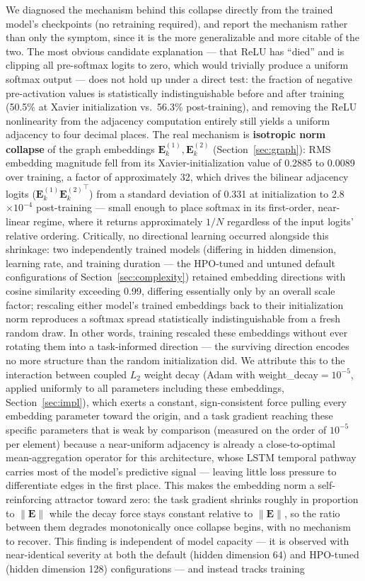 \documentclass[journal]{IEEEtran}
\begin{document}
We diagnosed the mechanism behind this collapse directly from the trained model's checkpoints (no retraining required), and report the mechanism rather than only the symptom, since it is the more generalizable and more citable of the two. The most obvious candidate explanation --- that ReLU has ``died'' and is clipping all pre-softmax logits to zero, which would trivially produce a uniform softmax output --- does not hold up under a direct test: the fraction of negative pre-activation values is statistically indistinguishable before and after training (50.5\% at Xavier initialization vs.\ 56.3\% post-training), and removing the ReLU nonlinearity from the adjacency computation entirely still yields a uniform adjacency to four decimal places. The real mechanism is \textbf{isotropic norm collapse} of the graph embeddings $\mathbf{E}^{(1)}_k,\mathbf{E}^{(2)}_k$ (Section~\ref{sec:graph}): RMS embedding magnitude fell from its Xavier-initialization value of 0.2885 to 0.0089 over training, a factor of approximately 32, which drives the bilinear adjacency logits ($\mathbf{E}^{(1)}_k{\mathbf{E}^{(2)}_k}^\top$) from a standard deviation of 0.331 at initialization to 2.8$\times 10^{-4}$ post-training --- small enough to place softmax in its first-order, near-linear regime, where it returns approximately $1/N$ regardless of the input logits' relative ordering. Critically, no directional learning occurred alongside this shrinkage: two independently trained models (differing in hidden dimension, learning rate, and training duration --- the HPO-tuned and untuned default configurations of Section~\ref{sec:complexity}) retained embedding directions with cosine similarity exceeding 0.99, differing essentially only by an overall scale factor; rescaling either model's trained embeddings back to their initialization norm reproduces a softmax spread statistically indistinguishable from a fresh random draw. In other words, training rescaled these embeddings without ever rotating them into a task-informed direction --- the surviving direction encodes no more structure than the random initialization did. We attribute this to the interaction between coupled $L_2$ weight decay (Adam with weight\_decay$=10^{-5}$, applied uniformly to all parameters including these embeddings, Section~\ref{sec:impl}), which exerts a constant, sign-consistent force pulling every embedding parameter toward the origin, and a task gradient reaching these specific parameters that is weak by comparison (measured on the order of $10^{-5}$ per element) because a near-uniform adjacency is already a close-to-optimal mean-aggregation operator for this architecture, whose LSTM temporal pathway carries most of the model's predictive signal --- leaving little loss pressure to differentiate edges in the first place. This makes the embedding norm a self-reinforcing attractor toward zero: the task gradient shrinks roughly in proportion to $\|\mathbf{E}\|$ while the decay force stays constant relative to $\|\mathbf{E}\|$, so the ratio between them degrades monotonically once collapse begins, with no mechanism to recover. This finding is independent of model capacity --- it is observed with near-identical severity at both the default (hidden dimension 64) and HPO-tuned (hidden dimension 128) configurations --- and instead tracks training 
\end{document}
